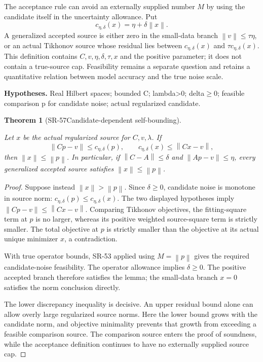\documentclass[11pt]{article}
\newtheorem{theorem}{Theorem}[section]
\theoremstyle{definition}\newtheorem{definition}[theorem]{Definition}
\theoremstyle{remark}\newtheorem{remark}[theorem]{Remark}
\newcommand{\nn}[1]{\left\lVert #1\right\rVert}
\begin{document}
The acceptance rule can avoid an externally supplied number $M$ by using
the candidate itself in the uncertainty allowance. Put
\[
c_{\eta,\delta}(x)=\eta+\delta\nn x .
\]
A generalized accepted source is either zero in the small-data branch
$\nn v\le\tau\eta$, or an actual Tikhonov source whose residual lies between
$c_{\eta,\delta}(x)$ and $\tau c_{\eta,\delta}(x)$.
This definition contains $C,v,\eta,\delta,\tau,x$ and the positive parameter;
it does not contain a true-source cap. Feasibility remains a separate
question and retains a quantitative relation between model accuracy and
the true noise scale.


\par{\small\textbf{Hypotheses.} Real Hilbert spaces; bounded C; lambda>0; delta\(\ge\)0; feasible comparison p for candidate noise; actual regularized candidate.}\par

\begin{theorem}[SR-57\quad Candidate-dependent self-bounding]\label{SR-57}

Let $x$ be the actual regularized source for $C,v,\lambda$. If
\[
\nn{Cp-v}\le c_{\eta,\delta}(p),\qquad
c_{\eta,\delta}(x)\le\nn{Cx-v},
\]
then $\nn x\le\nn p$.
In particular, if $\nn{C-A}\le\delta$ and $\nn{Ap-v}\le\eta$,
every generalized accepted source satisfies $\nn x\le\nn p$.

\end{theorem}
\begin{proof}

Suppose instead $\nn x>\nn p$. Since $\delta\ge0$, candidate noise
is monotone in source norm:
$c_{\eta,\delta}(p)\le c_{\eta,\delta}(x)$.
The two displayed hypotheses imply
$\nn{Cp-v}\le\nn{Cx-v}$.
Comparing Tikhonov objectives, the fitting-square term at $p$ is no larger,
whereas its positive weighted source-square term is strictly smaller.
The total objective at $p$ is strictly smaller than the objective at its
actual unique minimizer $x$, a contradiction.

With true operator bounds, SR-53 applied using $M=\nn p$ gives the
required candidate-noise feasibility. The operator allowance implies
$\delta\ge0$. The positive accepted branch therefore satisfies the lemma;
the small-data branch $x=0$ satisfies the norm conclusion directly.

The lower discrepancy inequality is decisive. An upper residual bound
alone can allow overly large regularized source norms. Here the lower
bound grows with the candidate norm, and objective minimality prevents
that growth from exceeding a feasible comparison source. The comparison
source enters the proof of soundness, while the acceptance definition
continues to have no externally supplied source cap.

\end{proof}
\end{document}
